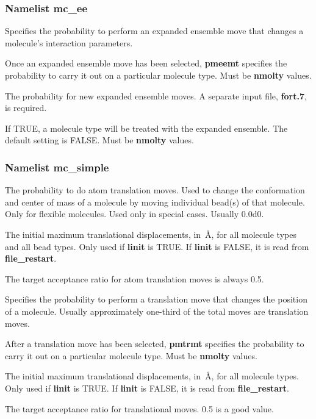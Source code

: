 \documentclass[12pt,letterpaper]{article}
\begin{document}
\subsubsection{Namelist \textbf{mc\_ee}}
 Specifies the probability to perform
an expanded ensemble move that changes a molecule's
interaction parameters.

 Once an expanded ensemble move has
been selected, {\bf pmeemt} specifies the probability to
carry it out on a particular molecule type. Must be {\bf
  nmolty} values.

 The probability for new expanded
ensemble moves. A separate input file, {\bf fort.7}, is
required.

 If TRUE, a molecule type will be
treated with the expanded ensemble. The default setting is
FALSE. Must be {\bf nmolty} values.

\subsubsection{Namelist \textbf{mc\_simple}}
 The probability to do atom
translation moves. Used to change the conformation and
center of mass of a molecule by moving individual bead(s) of
that molecule. Only for flexible molecules. Used only in
special cases. Usually 0.0d0.

 The initial maximum translational
displacements, in~\AA, for all molecule types and all bead
types. Only used if {\bf linit} is TRUE. If {\bf linit} is
FALSE, it is read from {\bf file\_restart}.

\noindent The target acceptance ratio for atom translation
moves is always 0.5.

 Specifies the probability to perform a
translation move that changes the position of a molecule.
Usually approximately one-third of the total moves are
translation moves.

 After a translation move has been
selected, {\bf pmtrmt} specifies the probability to carry it
out on a particular molecule type. Must be {\bf nmolty}
values.

 The initial maximum translational
displacements, in~\AA, for all molecule types. Only used if
{\bf linit} is TRUE. If {\bf linit} is FALSE, it is read
from {\bf file\_restart}.

 The target acceptance ratio for
translational moves. 0.5 is a good value.
\end{document}
